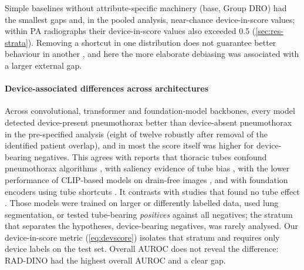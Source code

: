 \documentclass{ieeeaccess}
\begin{document}
Simple baselines without attribute-specific machinery (base, Group DRO) had the smallest gaps and, in the pooled analysis, near-chance device-in-score values; within PA radiographs their device-in-score values also exceeded 0.5 (\cref{sec:res-strata}). Removing a shortcut in one distribution does not guarantee better behaviour in another \cite{yang2024limits}, and here the more elaborate debiasing was associated with a larger external gap.

\paragraph{Device-associated differences across architectures}
Across convolutional, transformer and foundation-model backbones, every model detected device-present pneumothorax better than device-absent pneumothorax in the pre-specified analysis (eight of twelve robustly after removal of the identified patient overlap), and in most the score itself was higher for device-bearing negatives. This agrees with reports that thoracic tubes confound pneumothorax algorithms \cite{rueckel2020tubes,rueckel2021annotations}, with saliency evidence of tube bias \cite{wollek2023attention}, with the lower performance of CLIP-based models on drain-free images \cite{sourget2025clip}, and with foundation encoders using tube shortcuts \cite{li2025featurequality}. It contrasts with studies that found no tube effect \cite{thian2021external,seah2021hidden,graf2020tube}. Those models were trained on larger or differently labelled data, used lung segmentation, or tested tube-bearing \emph{positives} against all negatives; the stratum that separates the hypotheses, device-bearing negatives, was rarely analysed. Our device-in-score metric (\cref{eq:devscore}) isolates that stratum and requires only device labels on the test set. Overall AUROC does not reveal the difference: RAD-DINO had the highest overall AUROC and a clear gap.
\end{document}
